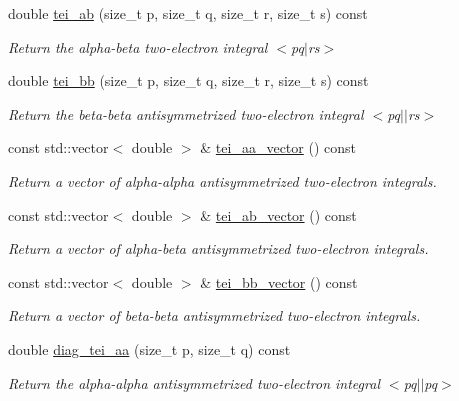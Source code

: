 \begin{DoxyCompactItemize}
double \mbox{\hyperlink{classforte_1_1_active_space_integrals_a5ba6a11664bc0f72e2a2508f76421ac9}{tei\+\_\+ab}} (size\+\_\+t p, size\+\_\+t q, size\+\_\+t r, size\+\_\+t s) const
\begin{DoxyCompactList}\small\item\em Return the alpha-\/beta two-\/electron integral $<$pq$\vert$rs$>$ \end{DoxyCompactList}\item 
double \mbox{\hyperlink{classforte_1_1_active_space_integrals_aac5d72add98a1f2583046687108941f6}{tei\+\_\+bb}} (size\+\_\+t p, size\+\_\+t q, size\+\_\+t r, size\+\_\+t s) const
\begin{DoxyCompactList}\small\item\em Return the beta-\/beta antisymmetrized two-\/electron integral $<$pq$\vert$$\vert$rs$>$ \end{DoxyCompactList}\item 
const std\+::vector$<$ double $>$ \& \mbox{\hyperlink{classforte_1_1_active_space_integrals_ad54901c053b19691f7920b1dd87e654b}{tei\+\_\+aa\+\_\+vector}} () const
\begin{DoxyCompactList}\small\item\em Return a vector of alpha-\/alpha antisymmetrized two-\/electron integrals. \end{DoxyCompactList}\item 
const std\+::vector$<$ double $>$ \& \mbox{\hyperlink{classforte_1_1_active_space_integrals_a3ffbe588c1db00534668eecccd2959fe}{tei\+\_\+ab\+\_\+vector}} () const
\begin{DoxyCompactList}\small\item\em Return a vector of alpha-\/beta antisymmetrized two-\/electron integrals. \end{DoxyCompactList}\item 
const std\+::vector$<$ double $>$ \& \mbox{\hyperlink{classforte_1_1_active_space_integrals_a04d77c7dfc8f4b8a2b80a2180da324cc}{tei\+\_\+bb\+\_\+vector}} () const
\begin{DoxyCompactList}\small\item\em Return a vector of beta-\/beta antisymmetrized two-\/electron integrals. \end{DoxyCompactList}\item 
double \mbox{\hyperlink{classforte_1_1_active_space_integrals_ae3d52adc6a64f6ad2c227c9387b50382}{diag\+\_\+tei\+\_\+aa}} (size\+\_\+t p, size\+\_\+t q) const
\begin{DoxyCompactList}\small\item\em Return the alpha-\/alpha antisymmetrized two-\/electron integral $<$pq$\vert$$\vert$pq$>$ \end{DoxyCompactList}\item 

\end{DoxyCompactItemize}

